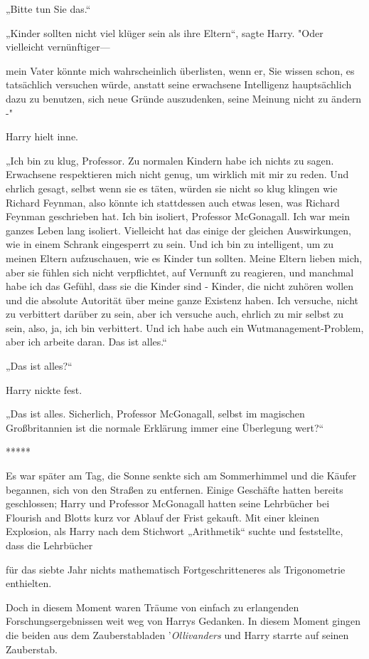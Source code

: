 {„Bitte tun Sie das.“

„Kinder sollten nicht viel klüger sein als ihre Eltern“, sagte Harry. "Oder vielleicht vernünftiger—

mein Vater könnte mich wahrscheinlich überlisten, wenn er, Sie wissen schon, es tatsächlich versuchen würde, anstatt seine erwachsene Intelligenz hauptsächlich dazu zu benutzen, sich neue Gründe auszudenken, seine Meinung nicht zu ändern -"

Harry hielt inne.

„Ich bin zu klug, Professor. Zu normalen Kindern habe ich nichts zu sagen. Erwachsene respektieren mich nicht genug, um wirklich mit mir zu reden. Und ehrlich gesagt, selbst wenn sie es täten, würden sie nicht so klug klingen wie Richard Feynman, also könnte ich stattdessen auch etwas lesen, was Richard Feynman geschrieben hat. Ich bin isoliert, Professor McGonagall. Ich war mein ganzes Leben lang isoliert. Vielleicht hat das einige der gleichen Auswirkungen, wie in einem Schrank eingesperrt zu sein. Und ich bin zu intelligent, um zu meinen Eltern aufzuschauen, wie es Kinder tun sollten. Meine Eltern lieben mich, aber sie fühlen sich nicht verpflichtet, auf Vernunft zu reagieren, und manchmal habe ich das Gefühl, dass sie die Kinder sind - Kinder, die nicht zuhören wollen und die absolute Autorität über meine ganze Existenz haben. Ich versuche, nicht zu verbittert darüber zu sein, aber ich versuche auch, ehrlich zu mir selbst zu sein, also, ja, ich bin verbittert. Und ich habe auch ein Wutmanagement-Problem, aber ich arbeite daran. Das ist alles.“

„Das ist alles?“

Harry nickte fest.

„Das ist alles. Sicherlich, Professor McGonagall, selbst im magischen Großbritannien ist die normale Erklärung immer eine Überlegung wert?“

*****

Es war später am Tag, die Sonne senkte sich am Sommerhimmel und die Käufer begannen, sich von den Straßen zu entfernen. Einige Geschäfte hatten bereits geschlossen; Harry und Professor McGonagall hatten seine Lehrbücher bei Flourish and Blotts kurz vor Ablauf der Frist gekauft. Mit einer kleinen Explosion, als Harry nach dem Stichwort „Arithmetik“ suchte und feststellte, dass die Lehrbücher

für das siebte Jahr nichts mathematisch Fortgeschritteneres als Trigonometrie enthielten.

Doch in diesem Moment waren Träume von einfach zu erlangenden Forschungsergebnissen weit weg von Harrys Gedanken. In diesem Moment gingen die beiden aus dem Zauberstabladen '\emph{Ollivanders} und Harry starrte auf seinen Zauberstab.

}
